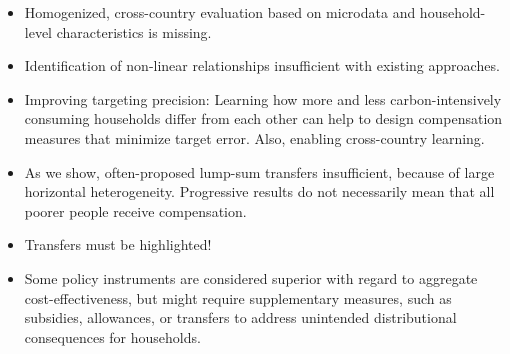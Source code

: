 \documentclass[12pt, a4paper]{article}
\begin{document}

\begin{itemize}
  \item Homogenized, cross-country evaluation based on microdata and household-level characteristics is missing.
  \item Identification of non-linear relationships insufficient with existing approaches.
  \item Improving targeting precision: Learning how more and less carbon-intensively consuming households differ from each other can help to design compensation measures that minimize target error. Also, enabling cross-country learning.
  \item As we show, often-proposed lump-sum transfers insufficient, because of large horizontal heterogeneity. Progressive results do not necessarily mean that all poorer people receive compensation.
  \item Transfers must be highlighted!
  \item Some policy instruments are considered superior with regard to aggregate cost-effectiveness, but might require supplementary measures, such as subsidies, allowances, or transfers to address unintended distributional consequences for households.

\end{itemize}
\end{document}
